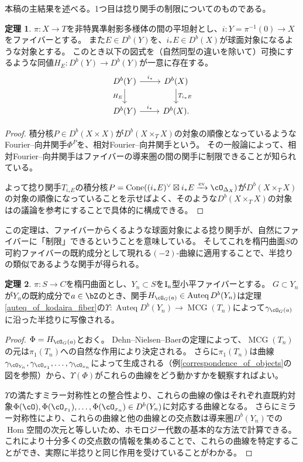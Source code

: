 \documentclass[uplatex,11pt,a4paper,dvipdfmx]{jsarticle}
\numberwithin{equation}{section}
\theoremstyle{definition}
\newtheorem{theorem}{定理}[section]
\DeclareMathOperator{\Hom}{\mathrm{Hom}}
\DeclareMathOperator{\Auteq}{\mathrm{Auteq}}
\DeclareMathOperator{\Cone}{\mathrm{Cone}}
\DeclareMathOperator{\ev}{\mathrm{ev}}
\DeclareMathOperator{\MCG}{\mathrm{MCG}}
\begin{document}
本稿の主結果を述べる。1つ目は捻り関手の制限についてのものである。
\begin{theorem}
    $\pi \colon X \to T$を非特異凖射影多様体の間の平坦射とし、$i \colon Y = \pi^{-1}(0) \to X$をファイバーとする。
    また$E \in D^b(Y)$を、$i_*E \in D^b(X)$が球面対象になるような対象とする。
    このとき以下の図式を（自然同型の違いを除いて）可換にするような同値$H_E \colon D^b(Y) \to D^b(Y)$が一意に存在する。
    \begin{equation}
        \begin{tikzcd}
            D^b(Y) \arrow[r,"i_*"]\arrow[d, "H_E"'] & D^b(X) \arrow[d,"T_{i_*E}"]\\
            D^b(Y) \arrow[r, "i_*"]& D^b(X).
        \end{tikzcd}
    \end{equation}
\end{theorem}
\begin{proof}
    積分核$P \in D^b(X \times X)$が$D^b(X \times_T X)$の対象の順像となっているようなFourier--向井関手$\Phi^P$を、相対Fourier--向井関手という。
    その一般論によって、相対Fourier--向井関手はファイバーの導来圏の間の関手に制限できることが知られている。

    よって捻り関手$T_{i_*E}$の積分核$P = \Cone((i_*E)^\vee \boxtimes i_*E \xrightarrow{\ev} \cO_{\Delta_X})$が$D^b(X \times_T X)$の対象の順像になっていることを示せばよく、そのような$D^b(X \times_T X)$の対象は\cite{MR2200048}の議論を参考にすることで具体的に構成できる。
\end{proof}
この定理は、ファイバーからくるような球面対象による捻り関手が、自然にファイバーに「制限」できるということを意味している。
そしてこれを楕円曲面$S$の可約ファイバーの既約成分として現れる$(-2)$-曲線に適用することで、半捻りの類似であるような関手が得られる。
\begin{theorem}
    $\pi \colon S \to C$を楕円曲面とし、$Y_n \subset S$を$\rm{I}_n$型小平ファイバーとする。
    $G \subset Y_n$が$Y_n$の既約成分で$a \in \bZ$のとき、関手$H_{\cO_G(a)} \in \Auteq D^b(Y_n)$は定理\ref{auteq_of_kodaira_fiber}の$\Upsilon \colon \Auteq D^b(Y_n) \to \MCG(T_n)$によって$\gamma_{\cO_G(a)}$に沿った半捻りに写像される。
\end{theorem}
\begin{proof}
    $\Phi = H_{\cO_G(a)}$とおく。
    Dehn--Nielsen--Baerの定理によって、$\MCG(T_n)$の元は$\pi_1(T_n)$への自然な作用により決定される。
    さらに$\pi_1(T_n)$は曲線$\gamma_{\cO_{Y_n}}, \gamma_{\cO_{x_1}}, \dots, \gamma_{\cO_{x_n}}$によって生成される（例\ref{correspondence_of_objects}の図を参照）から、$\Upsilon(\Phi)$がこれらの曲線をどう動かすかを観察すればよい。

    $\Upsilon$の満たすミラー対称性との整合性より、これらの曲線の像はそれぞれ直既約対象$\Phi(\cO), \Phi(\cO_{x_1}), \dots, \Phi(\cO_{x_n}) \in D^b(Y_n)$に対応する曲線となる。
    さらにミラー対称性により、これらの曲線と他の曲線との交点数は導来圏$D^b(Y_n)$での$\Hom$空間の次元と等しいため、ホモロジー代数の基本的な方法で計算できる。
    これにより十分多くの交点数の情報を集めることで、これらの曲線を特定することができ、実際に半捻りと同じ作用を受けていることがわかる。
\end{proof}
\end{document}
